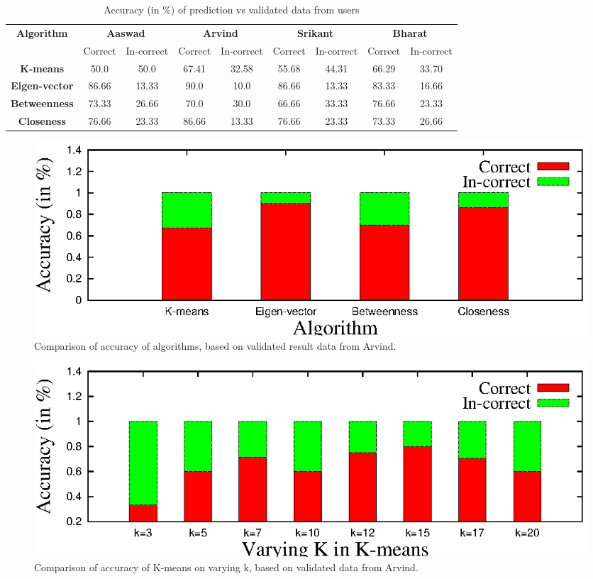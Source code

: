 \begin{table}[th]
\small
\centering
\begin{tabular}{ c|c|c|c|c|c|c|c|c| }
\hline
\multicolumn{1}{|c|}{\textbf{Algorithm}} &
\multicolumn{2}{c}{\textbf{Aaswad}}&
  \multicolumn{2}{|c|}{\textbf{Arvind}} &
  \multicolumn{2}{|c|}{\textbf{Srikant}} &
  \multicolumn{2}{|c|}{\textbf{Bharat}} \\
  \cline{2-9}
  \multicolumn{1}{|c|}{} &
  Correct & In-correct & Correct & In-correct & Correct & In-correct & Correct & In-correct \\  \hline
    \hline
  \multicolumn{1}{|c|}{\textbf{K-means}}
& 50.0 & 50.0 & 67.41 & 32.58 & 55.68 & 44.31 & 66.29 & 33.70 \\ \hline
  \multicolumn{1}{|c|}{\textbf{Eigen-vector}}
& 86.66 & 13.33 & 90.0 & 10.0 & 86.66 & 13.33 & 83.33 & 16.66 \\ \hline
  \multicolumn{1}{|c|}{\textbf{Betweenness}}
& 73.33 & 26.66 & 70.0 & 30.0 & 66.66 & 33.33 & 76.66 & 23.33\\  \hline
  \multicolumn{1}{|c|}{\textbf{Closeness}}
& 76.66 & 23.33 & 86.66 & 13.33 & 76.66 & 23.33 & 73.33 & 26.66 \\ \hline
\end{tabular}

\caption{\capfont Accuracy (in \%) of prediction vs validated data from users}
\label{tab:Accuracy of Algorithms}
\end{table}



\begin{figure}[ht]
    \centering
    \includegraphics[width=1\textwidth]{figures/social-result_arvind.eps}
    \caption{Comparison of accuracy of algorithms, based on validated result data from Arvind.}
    \label{fig:social-result-arvind}
\end{figure}

\begin{figure}[ht]
    \centering
    \includegraphics[width=1\textwidth]{figures/social-result_arvind_kmeans.eps}
    \caption{Comparison of accuracy of K-means on varying k, based on validated data from Arvind.}
    \label{fig:social-result-arvind-kmeans}
\end{figure}

